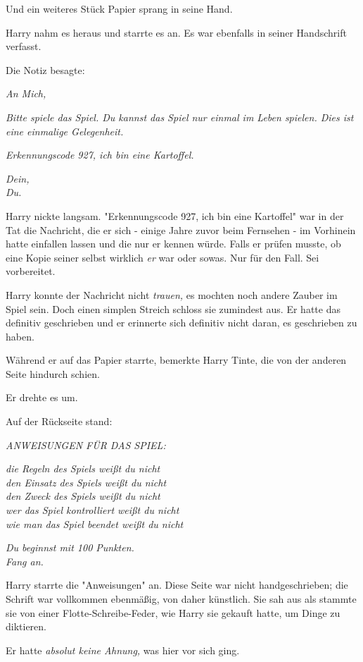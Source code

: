 {Und ein weiteres Stück Papier sprang in seine Hand.

Harry nahm es heraus und starrte es an. Es war ebenfalls in seiner Handschrift verfasst.

Die Notiz besagte:

\emph{An Mich,}

\emph{Bitte spiele das Spiel. Du kannst das Spiel nur einmal im Leben spielen. Dies ist eine einmalige Gelegenheit.}

\emph{Erkennungscode 927, ich bin eine Kartoffel.}

\emph{Dein,\\ Du.}

Harry nickte langsam. "Erkennungscode 927, ich bin eine Kartoffel" war in der Tat die Nachricht, die er sich - einige Jahre zuvor beim Fernsehen - im Vorhinein hatte einfallen lassen und die nur er kennen würde. Falls er prüfen musste, ob eine Kopie seiner selbst wirklich \emph{er} war oder sowas. Nur für den Fall. Sei vorbereitet.

Harry konnte der Nachricht nicht \emph{trauen,} es mochten noch andere Zauber im Spiel sein. Doch einen simplen Streich schloss sie zumindest aus. Er hatte das definitiv geschrieben und er erinnerte sich definitiv nicht daran, es geschrieben zu haben.

Während er auf das Papier starrte, bemerkte Harry Tinte, die von der anderen Seite hindurch schien.

Er drehte es um.

Auf der Rückseite stand:

\emph{ANWEISUNGEN FÜR DAS SPIEL:}

\emph{die Regeln des Spiels weißt du nicht\\ den Einsatz des Spiels weißt du nicht\\ den Zweck des Spiels weißt du nicht\\ wer das Spiel kontrolliert weißt du nicht\\ wie man das Spiel beendet weißt du nicht}

\emph{Du beginnst mit 100 Punkten.\\ Fang an.}

Harry starrte die "Anweisungen" an. Diese Seite war nicht handgeschrieben; die Schrift war vollkommen ebenmäßig, von daher künstlich. Sie sah aus als stammte sie von einer Flotte-Schreibe-Feder, wie Harry sie gekauft hatte, um Dinge zu diktieren.

Er hatte \emph{absolut keine Ahnung,} was hier vor sich ging.

}
